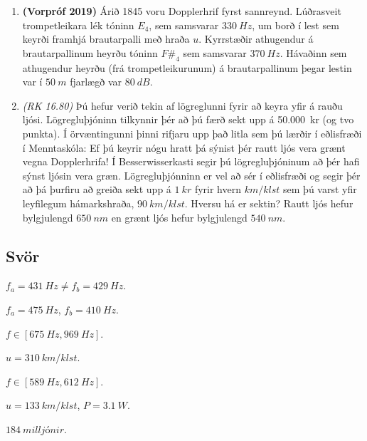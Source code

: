 \ifdefined \wholebook \else\documentclass[oneside]{book}\usepackage{EdlBook}\graphicspath{{figures/}}
\begin{document}
\begin{enumerate}[label = \textbf{Dæmi \thechapter.\arabic*.}]
\item \textbf{(Vorpróf 2019)} Árið 1845 voru Dopplerhrif fyrst sannreynd. Lúðrasveit trompetleikara lék tóninn $E_4$, sem samsvarar $\SI{330}{Hz}$, um borð í lest sem keyrði framhjá brautarpalli með hraða $u$. Kyrrstæðir athugendur á brautarpallinum heyrðu tóninn $F\#_4$ sem samsvarar $\SI{370}{Hz}$. Hávaðinn sem athugendur heyrðu (frá trompetleikurunum) á brautarpallinum þegar lestin var í $\SI{50}{m}$ fjarlægð var $\SI{80}{dB}$. 

\item \textit{(RK 16.80)} Þú hefur verið tekin af lögreglunni fyrir að keyra yfir á rauðu ljósi. Lögregluþjóninn tilkynnir þér að þú færð sekt upp á \SI{50.000}{kr} (og tvo punkta). Í örvæntingunni þinni rifjaru upp það litla sem þú lærðir í eðlisfræði í Menntaskóla: Ef þú keyrir nógu hratt þá sýnist þér rautt ljós vera grænt vegna Dopplerhrifa! Í Besserwisserkasti segir þú lögregluþjóninum að þér hafi sýnst ljósin vera græn. Lögregluþjónninn er vel að sér í eðlisfræði og segir þér að þá þurfiru að greiða sekt upp á $\SI{1}{kr}$ fyrir hvern $\si{km/klst}$ sem þú varst yfir leyfilegum hámarkshraða, $\SI{90}{km/klst}$. Hversu há er sektin? Rautt ljós hefur bylgjulengd $\SI{650}{nm}$ en grænt ljós hefur bylgjulengd $\SI{540}{nm}$.


\end{enumerate}

\subsection*{Svör}

\begin{enumerate*}[label = \vspace{0.15cm} \textbf{(\arabic*)}]
    \setcounter{enumi}{21}
  \item $f_a = \SI{431}{Hz} \neq f_b = \SI{429}{Hz}$.
  \item $f_a = \SI{475}{Hz}$, $f_b = \SI{410}{Hz}$.
  \item $f \in [\SI{675}{Hz}, \SI{969}{Hz}]$.
  \item $u = \SI{310}{km/klst}$.
  \item $f \in [\SI{589}{Hz}, \SI{612}{Hz}]$.
  \item $u = \SI{133}{km/klst}$, $P = \SI{3.1}{W}$.
  \item $\SI{184}{milljónir}$.
\end{enumerate*}
\end{document}
